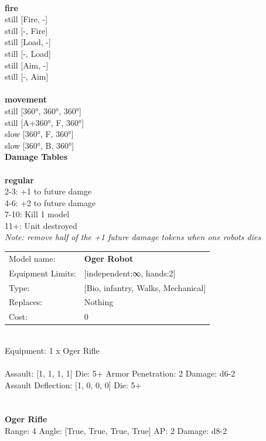 \ \\ {\bf fire } \\
still [Fire, -] \\
still [-, Fire] \\
still [Load, -] \\
still [-, Load] \\
still [Aim, -] \\
still [-, Aim] \\
\ \\ {\bf movement } \\
still [360°, 360°, 360°] \\
still [A+360°, F, 360°] \\
slow [360°, F, 360°] \\
slow [360°, B, 360°] \\


{\bf Damage Tables} \\
\ \\ {\bf regular } \\
2-3: +1 to future damge \\
4-6: +2 to future damage \\
7-10: Kill 1 model \\
11+: Unit destroyed \\
{{\it Note: remove half of the +1 future damage tokens when one robots dies}} \\


\noindent
\begin{tabular}{ll}
Model name: &{\bf Oger Robot } \\
Equipment Limits: &[independent:∞, hands:2] \\
Type: &[Bio, infantry, Walks, Mechanical] \\
Replaces: &Nothing \\
Cost: & 0\\
\end{tabular}
\ \\
Equipment: 1 x Oger Rifle \\
\ \\
Assault: [1, 1, 1, 1] Die: 5+ Armor Penetration: 2 Damage: d6-2 \\
Assault Deflection: [1, 0, 0, 0] Die: 5+\\
\indent  
\ \\

\ \\
{\bf Oger Rifle } \\



Range: 4  Angle: [True, True, True, True] AP: 2 Damage: d8-2 \\




